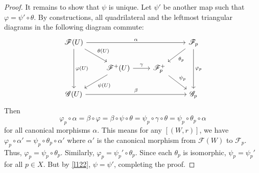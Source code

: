 \documentclass[12pt,letter]{article}
\newcommand{\comment}[1]{}
\begin{document}
\begin{proof}
	It remains to show that $\psi$ is unique. Let $\psi'$ be another map such that $\varphi=\psi'\circ\theta$. By constructions, all quadrilateral and the leftmost triangular diagrams in the following diagram commute:
	\[
	\begin{tikzcd}
\mathscr F(U) \arrow[rrr, "\alpha"] \arrow[rd, "\theta(U)"] \arrow[dd, "\varphi(U)"] &                                                     &                                     & \mathscr F_p \arrow[ld, "\theta_p"] \arrow[dd, "\varphi_p"] \\
                                                                            & \mathscr F^+(U) \arrow[ld, "\psi(U)"] \arrow[r, "\gamma"] & \mathscr F^+_p \arrow[rd, "\psi_p"] &                                                             \\
\mathscr G(U) \arrow[rrr, "\beta"]                                             &                                                     &                                     & \mathscr G_p                                               
\end{tikzcd}
	\]
	Then 
	\[\varphi_p\circ\alpha=\beta\circ\varphi=\beta\circ\psi\circ\theta=\psi_p\circ\gamma\circ\theta=\psi_p\circ\theta_p\circ\alpha\]
	for all canonical morphisms $\alpha$. This means for any $[(W, r)]$, we have $\varphi_p\circ \alpha'=\psi_p\circ\theta_p\circ\alpha'$ where $\alpha'$ is the canonical morphism from $\mathscr F(W)$ to $\mathscr F_p$. Thus, $\varphi_p=\psi_p\circ\theta_p$. Similarly, $\varphi_p=\psi_p'\circ\theta_p$. Since each $\theta_p$ is isomorphic, $\psi_p=\psi_p'$ for all $p\in X$. But by \autoref{l122}, $\psi=\psi'$, completing the proof.
	\comment{
	Note $\{V_p\}$ is a open cover of $U$ and we claim that $t_p|_{V_p\cap V_{p'}}=t_{p'}|_{V_p\cap V_{p'}}$ for every $p,p'\in U$. This is because for any $q\in V_p\cap V_{p'}$,
	\[[(V_p\cap V_{p'}, t_p|_{V_p\cap V_{p'}})]=[(V_p, t_p)]=s_q=[(V_{p'},t_{p'})]=[(V_p\cap V_{p'}, t_{p'}|_{V_p\cap V_{p'}})]\]
	Therefore, there is an open cover of $V_p\cap V_{p'}$ on which $t_p$ and $t_{p'}$ agree. Thus by locality they agree on intersections. Observe that
	\[\varphi(V_p)(t_p)|_{V_p\cap V_{p'}}=\varphi(V_p\cap V_{p'})(t_p|_{V_p\cap V_{p'}})=\varphi(V_p\cap V_{p'})(t_{p'}|_{V_p\cap V_{p'}})=\varphi(V_{p'})(t_{p'})|_{V_p\cap V_{p'}}\]
	so by the gluing condition we get a $g_s\in\mathscr G(U)$ such that $g_s|_{V_p}=\varphi(V_p)(t_p)$ for all $p\in U$. Define $\bar\varphi(U):s\mapsto g_s$.
	
	We claim that $\bar\varphi$ is a morphism of sheaves. This is the same as showing fo any $V\subseteq U$, $\bar\varphi(U)(s)|_V=\bar\varphi(V)(s|_V)$. By construction, $\bar\varphi(U)(s)|_V=g_s|_V$. Let $\{V_p'=V_p\cap V\}$ be an open covering of $V$. Then for any $p$ and $q\in V_p'$, $(s|_{V})_q=[(V, s|_{V})]=[(U, s)]=[(V_p, t_p)]=[(V_p', t_p|_{V_{p'}})]$.
	}
	\end{proof}
	
\end{document}
